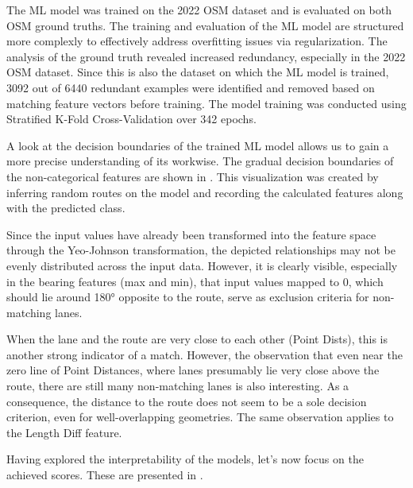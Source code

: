 The ML model was trained on the 2022 OSM dataset and is evaluated on both OSM ground truths. The training and evaluation of the ML model are structured more complexly to effectively address overfitting issues via regularization. The analysis of the ground truth revealed increased redundancy, especially in the 2022 OSM dataset. Since this is also the dataset on which the ML model is trained, 3092 out of 6440 redundant examples were identified and removed based on matching feature vectors before training. The model training was conducted using Stratified K-Fold Cross-Validation over 342 epochs.

A look at the decision boundaries of the trained ML model allows us to gain a more precise understanding of its workwise. The gradual decision boundaries of the non-categorical features are shown in . This visualization was created by inferring random routes on the model and recording the calculated features along with the predicted class. 

Since the input values have already been transformed into the feature space through the Yeo-Johnson transformation, the depicted relationships may not be evenly distributed across the input data. However, it is clearly visible, especially in the bearing features (max and min), that input values mapped to 0, which should lie around 180° opposite to the route, serve as exclusion criteria for non-matching lanes.

When the lane and the route are very close to each other (Point Dists), this is another strong indicator of a match. However, the observation that even near the zero line of Point Distances, where lanes presumably lie very close above the route, there are still many non-matching lanes is also interesting. As a consequence, the distance to the route does not seem to be a sole decision criterion, even for well-overlapping geometries. The same observation applies to the Length Diff feature.

Having explored the interpretability of the models, let's now focus on the achieved scores. These are presented in .

